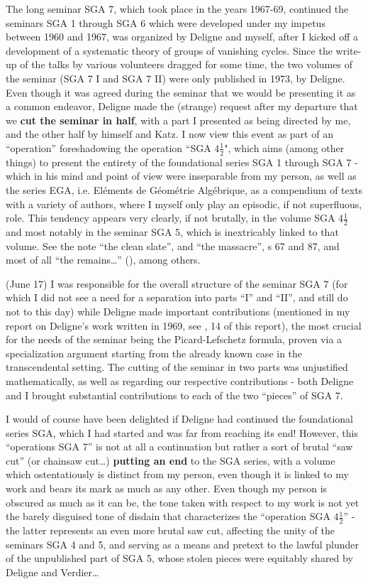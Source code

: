 The long seminar SGA 7, which took place in the years 1967-69,
continued the seminars SGA 1 through SGA 6 which were
developed under my impetus between 1960 and 1967, 
was organized by Deligne and myself, after I kicked off a development of a systematic
theory of groups of vanishing cycles.
Since the write-up of the talks by various volunteers dragged for some time, 
the two volumes of the seminar (SGA 7 I and SGA 7 II) were only published in 1973, by
Deligne. Even though it was agreed during the seminar that we would be
presenting it as a common endeavor, Deligne made the (strange) request after my departure
that we \textbf{cut the seminar in half}, with a part I presented as 
being directed by me, and the other half by himself and Katz. 
I now view this event as part of an ``operation'' foreshadowing the 
operation ``SGA $4\frac{1}{2}$", which aims 
(among other things) to present the entirety of the foundational series SGA 1
through SGA 7 - which in his mind and point of view were inseparable from my person, 
as well as the series EGA, i.e. El\'ements de G\'eom\'etrie Alg\'ebrique, 
as a compendium of texts with a variety of authors, where I myself only play an
episodic, if not superfluous, role.
This tendency appears very clearly, if not brutally, in the volume SGA $4\frac{1}{2}$
and most notably in the seminar SGA 5, which is inextricably linked to that volume.
See the note ``the clean slate'', and ``the massacre'', \no s 67 and 87, and most of all
``the remains\ldots'' (), among others.

(June 17) I was responsible for the overall structure of the seminar
SGA 7 (for which I did not see a need for a separation into parts ``I'' and ``II'', and still
do not to this day) while Deligne made important contributions 
(mentioned in my report on Deligne's work written in
1969, see , 14 of this report), 
the most crucial for the needs of the seminar being the Picard-Lefschetz formula, proven
via a specialization argument starting from the already known case in the transcendental
setting.
The cutting of the seminar in two parts was unjustified mathematically, as well as
regarding our respective contributions - both Deligne and I brought substantial
contributions to each of the two ``pieces'' of SGA 7.

I would of course have been delighted if Deligne had continued the foundational series
SGA, which I had started and was far from reaching its end!
However, this ``operations SGA 7'' is not at all a continuation but rather a sort of
brutal ``saw cut'' (or chainsaw cut\ldots) \textbf{putting an end} to the SGA series, 
with a volume which ostentatiously is distinct from my person, even though it is linked to
my work and bears its mark as much as any other. 
Even though my person is obscured as much as it can be, the tone taken with respect to my
work is not yet the barely disguised tone of disdain that characterizes the ``operation
SGA $4\frac{1}{2}$'' - 
the latter represents an even more brutal saw cut, affecting the unity of
the seminars SGA 4 and 5, and serving as a means and pretext to the lawful plunder of the
unpublished part of SGA 5, whose stolen pieces were equitably shared by
Deligne and Verdier\ldots

